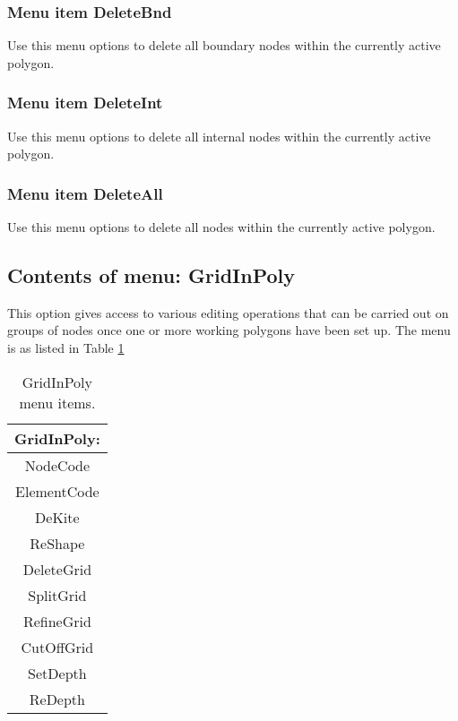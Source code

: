 \documentclass{article}
\begin{document}
\subsubsection[Menu item DeleteBnd]{Menu item DeleteBnd}

Use this menu options to delete all boundary nodes within the currently active polygon.

\subsubsection[Menu item DeleteInt]{Menu item DeleteInt}

Use this menu options to delete all internal nodes within the currently active polygon.

\subsubsection[Menu item DeleteBnd]{Menu item DeleteAll}

Use this menu options to delete all nodes within the currently active polygon.

\subsection{Contents of menu: GridInPoly}
This option gives access to various editing operations that can be carried out on groups of nodes once one or more working polygons have been set up. The menu is as listed in Table \ref{tab:GRIDINPOLY} 

\begin{table}[htb!]
 \caption{GridInPoly menu items.}
  \begin{center}
   \begin{tabular}{|c|}
    \hline
GridInPoly:\\     \hline
NodeCode \\ ElementCode \\ DeKite \\ ReShape \\
DeleteGrid \\ SplitGrid \\ RefineGrid \\
CutOffGrid \\ SetDepth \\ ReDepth \\
    \hline
   \end{tabular}
   \label{tab:GRIDINPOLY}
  \end{center}
\end{table}
\end{document}
